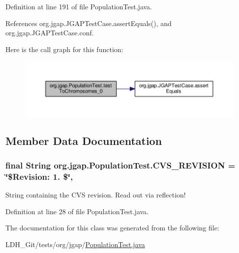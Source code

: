 Definition at line 191 of file Population\-Test.\-java.



References org.\-jgap.\-J\-G\-A\-P\-Test\-Case.\-assert\-Equals(), and org.\-jgap.\-J\-G\-A\-P\-Test\-Case.\-conf.



Here is the call graph for this function\-:
\nopagebreak
\begin{figure}[H]
\begin{center}
\leavevmode
\includegraphics[width=350pt]{classorg_1_1jgap_1_1_population_test_aebe0932ddcee66c6cf80e8d0ff359882_cgraph}
\end{center}
\end{figure}




\subsection{Member Data Documentation}
\hypertarget{classorg_1_1jgap_1_1_population_test_a4cbdd25a570bd8ebd10b5fd087b33da5}{
\subsubsection[{C\-V\-S\-\_\-\-R\-E\-V\-I\-S\-I\-O\-N}]{\setlength{\rightskip}{0pt plus 5cm}final String org.\-jgap.\-Population\-Test.\-C\-V\-S\-\_\-\-R\-E\-V\-I\-S\-I\-O\-N = \char`\"{}\$Revision\-: 1. \$\char`\"{}\hspace{0.3cm}{\ttfamily [static]}, {\ttfamily [private]}}}\label{classorg_1_1jgap_1_1_population_test_a4cbdd25a570bd8ebd10b5fd087b33da5}
String containing the C\-V\-S revision. Read out via reflection! 

Definition at line 28 of file Population\-Test.\-java.



The documentation for this class was generated from the following file\-:\begin{DoxyCompactItemize}
\item 
L\-D\-H\-\_\-\-Git/tests/org/jgap/\hyperlink{_population_test_8java}{Population\-Test.\-java}\end{DoxyCompactItemize}
